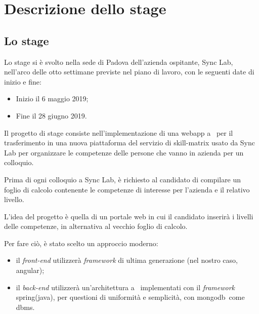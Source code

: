 
\chapter{Descrizione dello stage}\label{cap:descrizione-stage}



\section{Lo stage}

Lo stage si è svolto nella sede di Padova dell'azienda ospitante, Sync Lab, nell'arco delle otto settimane previste nel piano di lavoro, con le seguenti date di inizio e fine:
\begin{itemize}
	\item Inizio il 6 maggio 2019;
	\item Fine il 28 giugno 2019.
\end{itemize}
Il progetto di stage consiste nell'implementazione di una \gls{webapp} a \gloss\ per il trasferimento in una nuova piattaforma del servizio di \gls{skill-matrix} usato da Sync Lab per organizzare le competenze delle persone che vanno in azienda per un colloquio.

Prima di ogni colloquio a Sync Lab, è richiesto al candidato di compilare un foglio di calcolo contenente le competenze di interesse
per l'azienda e il relativo livello.

L'idea del progetto è quella di un portale web in cui il candidato inserirà i livelli delle competenze, in alternativa al vecchio foglio di calcolo.

Per fare ciò, è stato scelto un approccio moderno: 
\begin{itemize}
	\item il \textit{front-end} utilizzerà \textit{framework} di ultima generazione (nel nostro caso, \gls{angular}\gloss);
	\item il \textit{back-end} utilizzerà un'architettura a \gloss\ implementati con il \textit{framework} \gls{spring}\gloss (\gls{java}\gloss), per questioni di uniformità e semplicità, con \gls{mongodb}\gloss\ come \gls{dbms}\gloss.
\end{itemize}

